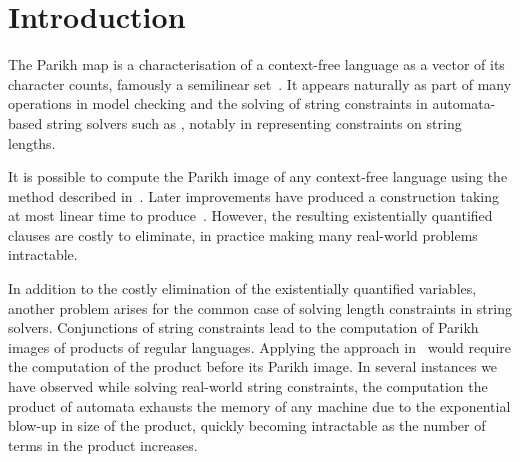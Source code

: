 \documentclass[acmsmall,review,anonymous]{acmart}\settopmatter{printfolios=true,printccs=false,printacmref=true}
\theoremstyle{definition}
\begin{document}


\maketitle


\section{Introduction}

The Parikh map is a characterisation of a context-free language as a vector of
its character counts, famously a semilinear set~\cite{parikh-theorem}. It
appears naturally as part of many operations in model checking and the solving
of string constraints in automata-based string solvers such as \Ostrich{},
notably in representing constraints on string lengths.

It is possible to compute the Parikh image of any context-free language using
the method described in~\cite{generate-parikh-image}. Later improvements have
produced a construction taking at most linear time to
produce~\cite{muscholl-linear}. However, the resulting existentially quantified
clauses are costly to eliminate, in practice making many real-world problems
intractable.

In addition to the costly elimination of the existentially quantified variables,
another problem arises for the common case of solving length constraints in
string solvers. Conjunctions of string constraints lead to the computation of
Parikh images of products of regular languages. Applying the approach
in~\cite{generate-parikh-image} would require the computation of the product
before its Parikh image. In several instances we have observed while solving
real-world string constraints, the computation the product of automata exhausts
the memory of any machine due to the exponential blow-up in size of the product,
quickly becoming intractable as the number of terms in the product increases.
\end{document}
